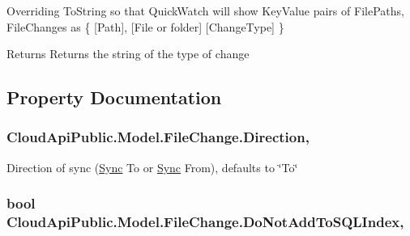 Overriding To\-String so that Quick\-Watch will show Key\-Value pairs of File\-Paths, File\-Changes as \{ \mbox{[}Path\mbox{]}, \mbox{[}File or folder\mbox{]} \mbox{[}Change\-Type\mbox{]} \} 

\begin{DoxyReturn}{Returns}
Returns the string of the type of change
\end{DoxyReturn}


\subsection{Property Documentation}
\hypertarget{class_cloud_api_public_1_1_model_1_1_file_change_ae9286566d391fe9d646db55e20b1ccab}{
\subsubsection[{Direction}]{ Cloud\-Api\-Public.\-Model.\-File\-Change.\-Direction\hspace{0.3cm}{\ttfamily [get]}, {\ttfamily [set]}}}\label{class_cloud_api_public_1_1_model_1_1_file_change_ae9286566d391fe9d646db55e20b1ccab}


Direction of sync (\hyperlink{namespace_cloud_api_public_1_1_sync}{Sync} To or \hyperlink{namespace_cloud_api_public_1_1_sync}{Sync} From), defaults to \char`\"{}\-To\char`\"{} 

\hypertarget{class_cloud_api_public_1_1_model_1_1_file_change_aa979e65ac9cd9783870afe5b25137296}{
\subsubsection[{Do\-Not\-Add\-To\-S\-Q\-L\-Index}]{\setlength{\rightskip}{0pt plus 5cm}bool Cloud\-Api\-Public.\-Model.\-File\-Change.\-Do\-Not\-Add\-To\-S\-Q\-L\-Index\hspace{0.3cm}{\ttfamily [get]}, {\ttfamily [set]}}}\label{class_cloud_api_public_1_1_model_1_1_file_change_aa979e65ac9cd9783870afe5b25137296}


